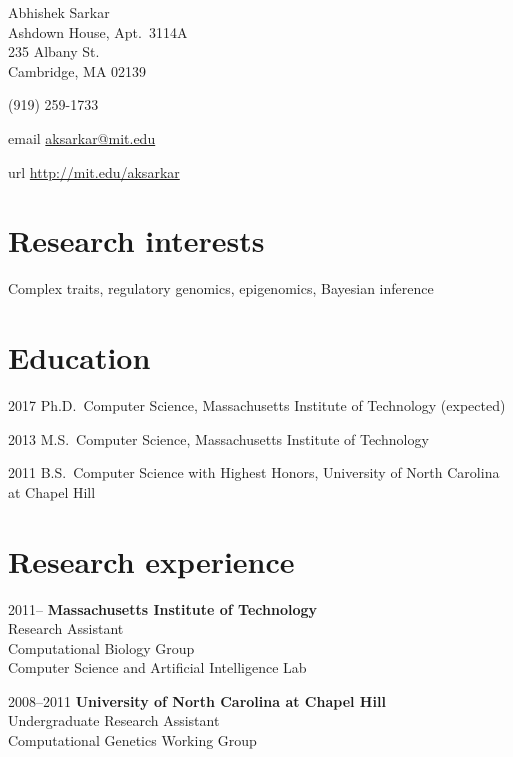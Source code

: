 \documentclass{article}
\begin{document}
{\LARGE Abhishek Sarkar\vspace{1em}}\\
Ashdown House, Apt.\ 3114A\\
235 Albany St.\\
Cambridge, MA 02139\vspace{1em}

(919) 259-1733

\begin{hdesc}
\item[email] \url{aksarkar@mit.edu}
\item[url] \url{http://mit.edu/aksarkar}
\end{hdesc}

\section*{Research interests}
Complex traits, regulatory genomics, epigenomics, Bayesian inference

\section*{Education}
\begin{hdesc}
\item[2017] Ph.D.\ Computer Science, Massachusetts Institute of Technology
  (expected)
\item[2013] M.S.\ Computer Science, Massachusetts Institute of Technology
\item[2011] B.S.\ Computer Science with Highest Honors, University of North
  Carolina at Chapel Hill
\end{hdesc}

\section*{Research experience}
\begin{hdesc}[itemsep=1em]
\item[2011--] \textbf{Massachusetts Institute of Technology}\\
Research Assistant\\
Computational Biology Group\\
Computer Science and Artificial Intelligence Lab

\item[2008--2011] \textbf{University of North Carolina at Chapel Hill}\\
Undergraduate Research Assistant\\
Computational Genetics Working Group
\end{hdesc}
\end{document}
